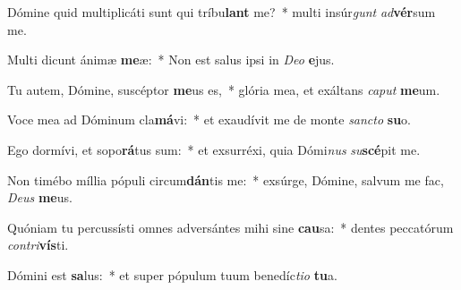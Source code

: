 \item Dómine quid multiplicáti sunt qui tríbu\textbf{lant} me?~* multi insúr\textit{gunt} \textit{ad}\textbf{vér}sum me.
\item Multi dicunt ánimæ \textbf{me}æ:~* Non est salus ipsi in \textit{De}\textit{o} \textbf{e}jus.
\item Tu autem, Dómine, suscéptor \textbf{me}us es,~* glória mea, et exáltans \textit{ca}\textit{put} \textbf{me}um.
\item Voce mea ad Dóminum cla\textbf{má}vi:~* et exaudívit me de monte \textit{sanc}\textit{to} \textbf{su}o.
\item Ego dormívi, et sopo\textbf{rá}tus sum:~* et exsurréxi, quia Dómi\textit{nus} \textit{su}\textbf{scé}pit me.
\item Non timébo míllia pópuli circum\textbf{dán}tis me:~* exsúrge, Dómine, salvum me fac, \textit{De}\textit{us} \textbf{me}us.
\item Quóniam tu percussísti omnes adversántes mihi sine \textbf{cau}sa:~* dentes peccatórum \textit{con}\textit{tri}\textbf{vís}ti.
\item Dómini est \textbf{sa}lus:~* et super pópulum tuum benedíc\textit{ti}\textit{o} \textbf{tu}a.
